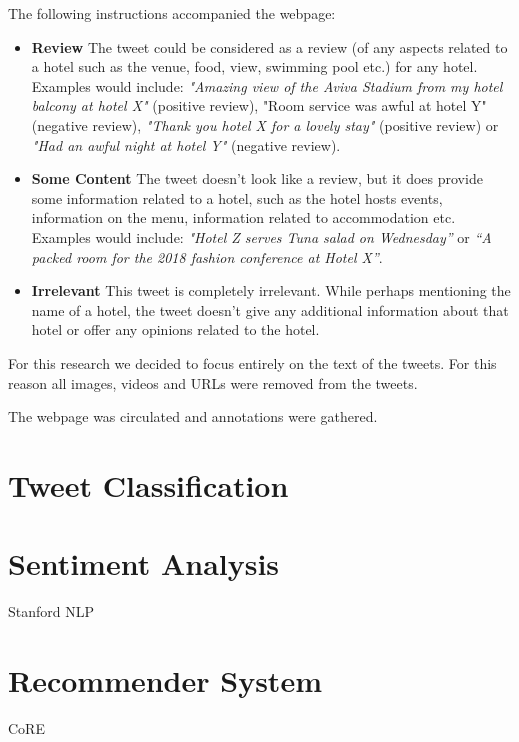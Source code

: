 The following instructions accompanied the webpage:
\begin{itemize}
    \item \textbf{Review} \newline
    The tweet could be considered as a review (of any aspects related to a hotel such as the venue, food, view, swimming pool etc.) for any hotel. Examples would include: \emph{"Amazing view of the Aviva Stadium from my hotel balcony at hotel X"} (positive review), "Room service was awful at hotel Y" (negative review), \emph{"Thank you hotel X for a lovely stay"} (positive review) or \emph{"Had an awful night at hotel Y"} (negative review).
    \item \textbf{Some Content} \newline
    The tweet doesn't look like a review, but it does provide some information related to a hotel, such as the hotel hosts events, information on the menu, information related to accommodation etc. Examples would include: \emph{"Hotel Z serves Tuna salad on Wednesday”} or \emph{“A packed room for the 2018 fashion conference at Hotel X”}.
    \item \textbf{Irrelevant} \newline
    This tweet is completely irrelevant. While perhaps mentioning the name of a hotel, the tweet doesn't give any additional information about that hotel or offer any opinions related to the hotel.
\end{itemize}

For this research we decided to focus entirely on the text of the tweets. For this reason all images, videos and URLs were removed from the tweets.

The webpage was circulated and annotations were gathered.

\section{Tweet Classification}

\section{Sentiment Analysis}

Stanford NLP

\section{Recommender System}

CoRE
